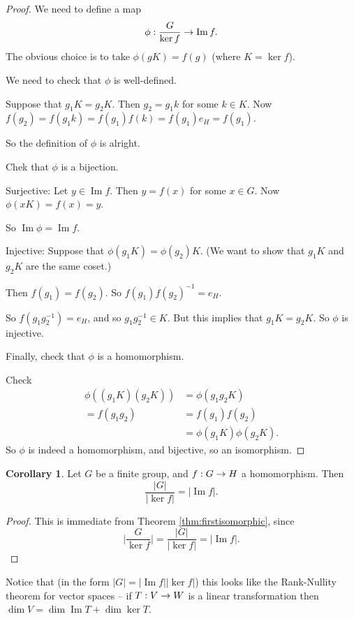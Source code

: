 \documentclass{article}
\theoremstyle{definition} \newtheorem*{definition}{Definition}
\newtheorem*{corollary}{Corollary} \newtheorem*{remark}{Remark}
\DeclareMathOperator{\Ima}{Im} \DeclareMathOperator{\Sym}{Sym}
\begin{document}
  \begin{proof} We need to define a map \[ \func{\phi}{\frac{G}{\ker f}}{\Ima
    f}.  \] The obvious choice is to take $\phi (gK)=f(g)$ (where $K = \ker
    f$).

    We need to check that $\phi$ is well-defined.

    Suppose that $g_1K=g_2K$. Then $g_2=g_1k$ for some $k \in K$. Now
    $f(g_2)=f(g_1k)=f(g_1)f(k)=f(g_1)e_H=f(g_1)$.

    So the definition of $\phi$ is alright.

    Chek that $\phi$ is a bijection.

    Surjective: Let $y \in \Ima f$. Then $y=f(x)$ for some $x \in G$. Now
    $\phi(xK)=f(x)=y$. 

    So $\Ima \phi = \Ima f$.

    Injective: Suppose that $\phi(g_1K)=\phi(g_2)K$. (We want to show that
    $g_1K$ and $g_2K$ are the same coset.)

    Then $f(g_1)=f(g_2)$. So $f(g_1)f(g_2)^{-1}=e_H$.

    So $f(g_1g_2^{-1})=e_H$, and so $g_1g_2^{-1}\in K$. But this implies that
    $g_1K=g_2K$. So $\phi$ is injective.

    Finally, check that $\phi$ is a homomorphism.

    Check \begin{align*} \phi((g_1K)(g_2K)) &= \phi(g_1g_2K)\\
      =f(g_1g_2)&=f(g_1)f(g_2)\\ &=\phi(g_1K)\phi(g_2K).  \end{align*} So
    $\phi$ is indeed a homomorphism, and bijective, so an isomorphism.
  \end{proof}

  \begin{corollary} Let $G$ be a finite group, and $f : G \rightarrow H$ a
    homomorphism. Then \[ \frac{|G|}{|\ker f|} = |\Ima f|.  \] \end{corollary}
  \begin{proof} This is immediate from Theorem \ref{thm:firstisomorphic}, since
    \[ \bigl|\frac{G}{\ker f}\bigr| = \frac{|G|}{|\ker f|} = |\Ima f|.  \]
  \end{proof} Notice that (in the form $|G|=|\Ima f||\ker f|$) this looks like
  the Rank-Nullity theorem for vector spaces -- if $T : V \rightarrow W$ is a linear
  transformation then $\dim V = \dim \Ima T + \dim \ker T$.
\end{document}
